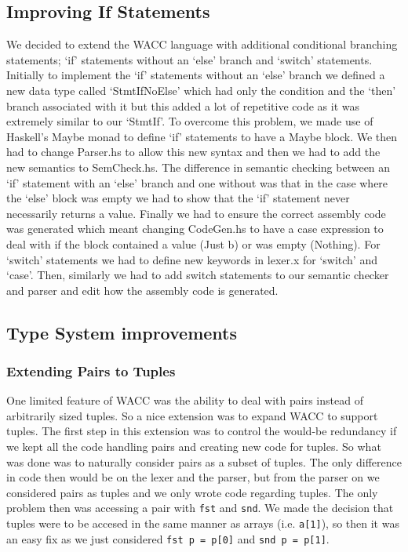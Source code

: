 \documentclass{article}
\begin{document}
\subsection{Improving If Statements}
We decided to extend the WACC language with additional conditional branching statements; `if' statements without an `else' branch and `switch' statements. Initially to implement the `if' statements without an `else' branch we defined a new data type called `StmtIfNoElse' which had only the condition and the `then' branch associated with it but this added a lot of repetitive code as it was extremely similar to our `StmtIf'. To overcome this problem, we made use of Haskell's Maybe monad to  define `if' statements to have a Maybe block. We then had to change Parser.hs to allow this new syntax and then we had to add the new semantics to SemCheck.hs. The difference in semantic checking between an `if' statement with an `else' branch and one without was that in the case where the `else' block was empty we had to show that the `if' statement never necessarily returns a value.  Finally we had to ensure the correct assembly code was generated which meant changing CodeGen.hs to have a case expression to deal with if the block contained a value (Just b) or was empty (Nothing).
For `switch' statements we had to define new keywords in lexer.x for `switch' and `case'. Then, similarly we had to add switch statements to our semantic checker and parser and edit how the assembly code is generated.
\subsection{Type System improvements}
\subsubsection{Extending Pairs to Tuples}
One limited feature of WACC was the ability to deal with pairs instead of arbitrarily sized tuples. So a nice extension was to expand WACC to support tuples. The first step in this extension was to control the would-be redundancy if we kept all the code handling pairs and creating new code for tuples. So what was done was to naturally consider pairs as a subset of tuples. The only difference in code then would be on the lexer and the parser, but from the parser on we considered pairs as tuples and we only wrote code regarding tuples. The only problem then was accessing a pair with \texttt{fst} and \texttt{snd}. We made the decision that tuples were to be accesed in the same manner as arrays (i.e. \texttt{a[1]}), so then it  was an easy fix as we just considered \texttt{fst p = p[0]} and \texttt{snd p = p[1]}.
\end{document}
